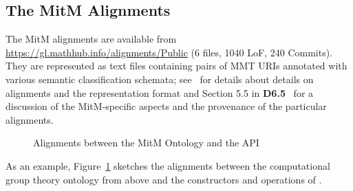 \subsection{The MitM Alignments}

The MitM alignments are available from \url{https://gl.mathhub.info/alignments/Public} (6
files, 1040 LoF, 240 Commits). They are represented as text files containing pairs of MMT
URIs annotated with various semantic classification schemata;
see~\cite{MueGauKal:cacfms17} for details about details on alignments and the
representation format and Section 5.5 in \textbf{D6.5}~\cite{ODK-D6.5} for a discussion of
the MitM-specific aspects and the provenance of the particular alignments. 
\begin{figure}[ht]\centering
  \caption{Alignments between the MitM Ontology and the \GAP API}\label{fig:cgtontology}
\end{figure}

As an example, Figure~\ref{fig:cgtontology} sketches the alignments between the
computational group theory ontology from above and the constructors and operations of
\GAP.



